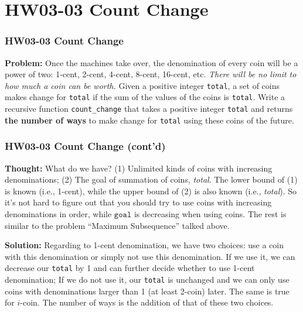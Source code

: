 \documentclass[aspectratio=169]{beamer}
\begin{document}
\section{HW03-03 Count Change}

\begin{frame}[fragile]
\frametitle{{HW03-03 Count Change}}
    
\textbf{Problem:} Once the machines take over, the denomination of every coin will be a power of two: 1-cent, 2-cent, 4-cent, 8-cent, 16-cent, etc. \textit{There will be no limit to how much a coin can be worth.} Given a positive integer \texttt{total}, a set of coins makes change for \texttt{total} if the sum of the values of the coins is \texttt{total}. Write a recursive function \texttt{count\_change} that takes a positive integer \texttt{total} and returns \textbf{the number of ways} to make change for \texttt{total} using these coins of the future.

\end{frame}

\begin{frame}[fragile]
\frametitle{{HW03-03 Count Change (cont'd)}}
    
\textbf{Thought:} What do we have? (1) Unlimited kinds of coins with increasing denominations; (2) The goal of summation of coins, \textit{total}. The lower bound of (1) is known (i.e., 1-cent), while the upper bound of (2) is also known (i.e., \textit{total}). So it's not hard to figure out that you should try to use coins with increasing denominations in order, while $\texttt{goal}$ is decreasing when using coins. The rest is similar to the problem ``Maximum Subsequence'' talked above.

\textbf{Solution:} Regarding to 1-cent denomination, we have two choices: use a coin with this denomination or simply not use this denomination. If we use it, we can decrease our \texttt{total} by 1 and can further decide whether to use 1-cent denomination; If we do not use it, our \texttt{total} is unchanged and we can only use coins with denominations larger than 1 (at least 2-coin) later. The same is true for $i$-coin. The number of ways is the addition of that of these two choices.

\end{frame}
\end{document}
